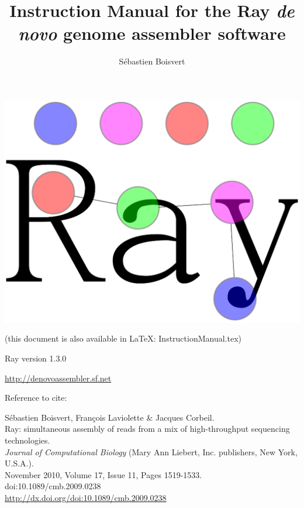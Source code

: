 \documentclass{article}
\begin{document}
\author{Sébastien Boisvert}
\title{Instruction Manual for the Ray \emph{de novo} genome assembler software}
\maketitle

\includegraphics[scale=0.2]{logo/logo-no-text.eps}

(this document is also available in \LaTeX: InstructionManual.tex)

\vspace{2cm}
Ray version 1.3.0

\vspace{2cm}

\href{http://denovoassembler.sf.net}{http://denovoassembler.sf.net}

\vspace{2cm}

Reference to cite: 
\vspace{2cm}

\noindent
Sébastien Boisvert, François Laviolette \& Jacques Corbeil.\\
Ray: simultaneous assembly of reads from a mix of high-throughput sequencing technologies.\\
\emph{Journal of Computational Biology} (Mary Ann Liebert, Inc. publishers, New York, U.S.A.).\\
November 2010, Volume 17, Issue 11, Pages 1519-1533.\\
doi:10.1089/cmb.2009.0238\\
\href{http://dx.doi.org/doi:10.1089/cmb.2009.0238}{http://dx.doi.org/doi:10.1089/cmb.2009.0238}
\end{document}
